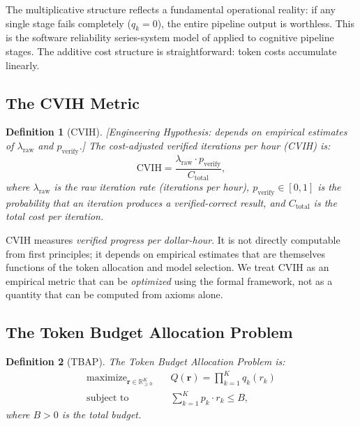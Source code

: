 \documentclass[11pt, a4paper]{googledeepmind}
\DeclareMathOperator*{\maximize}{maximize}
\newtheorem{definition}{Definition}[section]
\begin{document}
The multiplicative structure reflects a fundamental operational reality: if any single stage fails completely ($q_k = 0$), the entire pipeline output is worthless. This is the software reliability series-system model of \citep{barlow1975} applied to cognitive pipeline stages. The additive cost structure is straightforward: token costs accumulate linearly.

\subsection{The CVIH Metric}

\begin{definition}[CVIH]
\label{def:econ-cvih}
\emph{[Engineering Hypothesis: depends on empirical estimates of $\lambda_{\text{raw}}$ and $p_{\text{verify}}$.]}
The \emph{cost-adjusted verified iterations per hour} (CVIH) is:
\begin{equation}\label{eq:econ-cvih-def}
    \text{CVIH} = \frac{\lambda_{\text{raw}} \cdot p_{\text{verify}}}{C_{\text{total}}},
\end{equation}
where $\lambda_{\text{raw}}$ is the raw iteration rate (iterations per hour), $p_{\text{verify}} \in [0,1]$ is the probability that an iteration produces a verified-correct result, and $C_{\text{total}}$ is the total cost per iteration.
\end{definition}

CVIH measures \emph{verified progress per dollar-hour}. It is not directly computable from first principles; it depends on empirical estimates that are themselves functions of the token allocation and model selection. We treat CVIH as an empirical metric that can be \emph{optimized} using the formal framework, not as a quantity that can be computed from axioms alone.

\subsection{The Token Budget Allocation Problem}

\begin{definition}[TBAP]
\label{def:econ-tbap}
The \emph{Token Budget Allocation Problem} is:
\begin{equation}\label{eq:econ-tbap}
\begin{aligned}
    \maximize_{\mathbf{r} \in \mathbb{R}_{\geq 0}^K} \quad & Q(\mathbf{r}) = \prod_{k=1}^{K} q_k(r_k) \\
    \text{subject to} \quad & \sum_{k=1}^{K} p_k \cdot r_k \leq B,
\end{aligned}
\end{equation}
where $B > 0$ is the total budget.
\end{definition}
\end{document}
